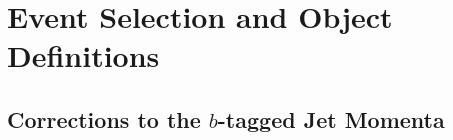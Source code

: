 \section{Event Selection and Object Definitions}
\label{sec:hh_event_selection}

\subsection{Corrections to the $b$-tagged Jet Momenta}
